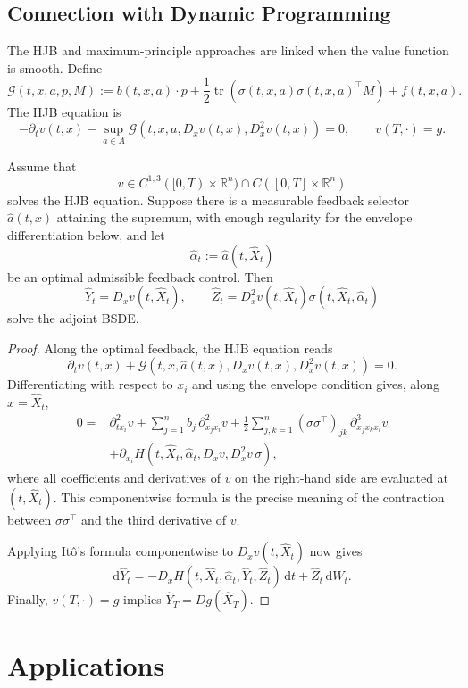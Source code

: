 \subsection{Connection with Dynamic Programming}

The HJB and maximum-principle approaches are linked when the value function is smooth. Define
\[
\mathcal G(t,x,a,p,M)
:=b(t,x,a)\cdot p
+\frac12\operatorname{tr}\!\left(
\sigma(t,x,a)\sigma(t,x,a)^\top M
\right)
+f(t,x,a).
\]
The HJB equation is
\[
-\partial_tv(t,x)
-\sup_{a\in A}
\mathcal G(t,x,a,D_xv(t,x),D_x^2v(t,x))
=0,
\qquad v(T,\cdot)=g.
\]

\begin{thm}
Assume that
\[
v\in C^{1,3}([0,T)\times\mathbb R^n)
\cap C([0,T]\times\mathbb R^n)
\]
solves the HJB equation. Suppose there is a measurable feedback selector \(\hat a(t,x)\) attaining the supremum, with enough regularity for the envelope differentiation below, and let
\[
\hat\alpha_t:=\hat a(t,\hat X_t)
\]
be an optimal admissible feedback control. Then
\[
\hat Y_t=D_xv(t,\hat X_t),
\qquad
\hat Z_t=D_x^2v(t,\hat X_t)
\sigma(t,\hat X_t,\hat\alpha_t)
\]
solve the adjoint BSDE.
\end{thm}

\begin{proof}
Along the optimal feedback, the HJB equation reads
\[
\partial_tv(t,x)
+\mathcal G(t,x,\hat a(t,x),D_xv(t,x),D_x^2v(t,x))
=0.
\]
Differentiating with respect to \(x_i\) and using the envelope condition gives, along \(x=\hat X_t\),
\[
\begin{aligned}
0={}&\partial_{tx_i}^2v
+\sum_{j=1}^n b_j\,\partial_{x_jx_i}^2v
+\frac12\sum_{j,k=1}^n
(\sigma\sigma^\top)_{jk}\,
\partial_{x_jx_kx_i}^3v\\
&+\partial_{x_i}H
\left(
 t,\hat X_t,\hat\alpha_t,
 D_xv,
 D_x^2v\,\sigma
\right),
\end{aligned}
\]
where all coefficients and derivatives of \(v\) on the right-hand side are evaluated at \((t,\hat X_t)\). This componentwise formula is the precise meaning of the contraction between \(\sigma\sigma^\top\) and the third derivative of \(v\).

Applying It\^o's formula componentwise to \(D_xv(t,\hat X_t)\) now gives
\[
\mathrm d\hat Y_t
=-D_xH(t,\hat X_t,\hat\alpha_t,\hat Y_t,\hat Z_t)\,\mathrm dt
+\hat Z_t\,\mathrm dW_t.
\]
Finally, \(v(T,\cdot)=g\) implies \(\hat Y_T=Dg(\hat X_T)\).
\end{proof}

\section{Applications}

